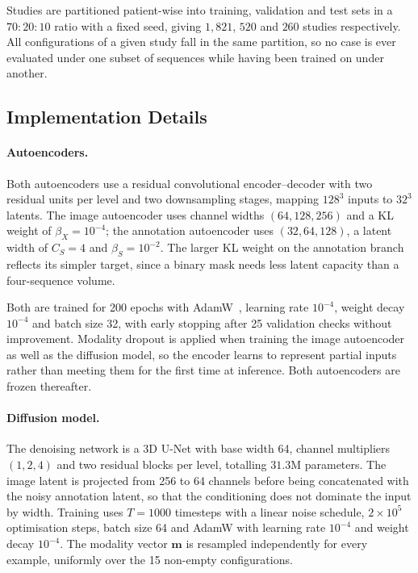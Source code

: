 Studies are partitioned patient-wise into training, validation and test sets
in a $70{:}20{:}10$ ratio with a fixed seed, giving $1{,}821$, $520$ and
$260$ studies respectively. All configurations of a given study fall in the
same partition, so no case is ever evaluated under one subset of sequences
while having been trained on under another.

\subsection{Implementation Details}
\label{subsec:implementation}

\paragraph{Autoencoders.}
Both autoencoders use a residual convolutional encoder--decoder with two
residual units per level and two downsampling stages, mapping $128^{3}$ inputs
to $32^{3}$ latents. The image autoencoder uses channel widths
$(64, 128, 256)$ and a KL weight of $\beta_{X} = 10^{-4}$; the annotation
autoencoder uses $(32, 64, 128)$, a latent width of $C_{S} = 4$ and
$\beta_{S} = 10^{-2}$. The larger KL weight on the annotation branch reflects its
simpler target, since a binary mask needs less latent capacity than a
four-sequence volume.

Both are trained for 200 epochs with AdamW~\cite{adam}, learning rate
$10^{-4}$, weight decay $10^{-4}$ and batch size 32, with early stopping after
25 validation checks without improvement. Modality dropout is applied when
training the image autoencoder as well as the diffusion model, so the encoder learns to
represent partial inputs rather than meeting them for the first time at
inference. Both autoencoders are frozen thereafter.

\paragraph{Diffusion model.}
The denoising network is a 3D U-Net with base width 64, channel multipliers
$(1, 2, 4)$ and two residual blocks per level, totalling $31.3$M parameters.
The image latent is projected from 256 to 64 channels before being
concatenated with the noisy annotation latent, so that the conditioning does not dominate the input by width. Training uses $T = 1000$ timesteps with a
linear noise schedule, $2 \times 10^{5}$ optimisation steps, batch size 64 and
AdamW with learning rate $10^{-4}$ and weight decay $10^{-4}$. The modality
vector $\mathbf{m}$ is resampled independently for every example, uniformly
over the 15 non-empty configurations.

